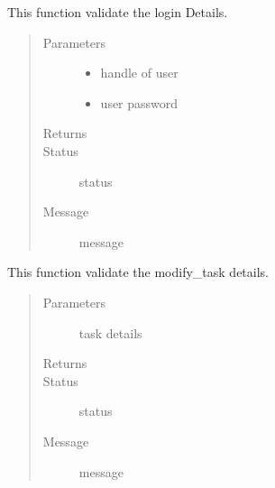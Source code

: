 \documentclass[letterpaper,10pt,english]{sphinxmanual}
\begin{document}
\begin{fulllineitems}
\label{\detokenize{janta:janta.viewhelper.validate_login}}
This function validate the login Details.
\begin{quote}\begin{description}
\item[{Parameters}] \leavevmode\begin{itemize}
\item {} 
 \textendash{} handle of user

\item {} 
 \textendash{} user password

\end{itemize}

\item[{Returns}] \leavevmode


\item[{Status}] \leavevmode
status

\item[{Message}] \leavevmode
message

\end{description}\end{quote}

\end{fulllineitems}


\begin{fulllineitems}
\label{\detokenize{janta:janta.viewhelper.validate_modify_task}}
This function validate the modify\_task details.
\begin{quote}\begin{description}
\item[{Parameters}] \leavevmode
{} \textendash{} task details

\item[{Returns}] \leavevmode


\item[{Status}] \leavevmode
status

\item[{Message}] \leavevmode
message

\end{description}\end{quote}

\end{fulllineitems}
\end{document}
